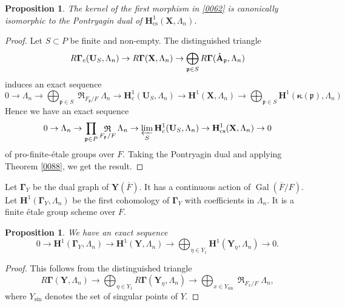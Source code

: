 \documentclass{amsart}
\newtheorem{Prop}[Thm]{Proposition}
\theoremstyle{remark}
\numberwithin{equation}{section}
\newcommand{\closure}[1]{\overline{#1}}
\newcommand{\invlim}{\varprojlim}
\newcommand{\alg}[1]{\mathbf{#1}}
\newcommand{\ideal}[1]{\mathfrak{#1}}
\newcommand{\varalg}[1]{\bm{#1}}
\newcommand{\cs}{\mathrm{cs}}
\DeclareMathOperator{\Gal}{Gal}
\DeclareMathOperator{\Weil}{\mathfrak{R}}
\begin{document}
\begin{Prop}
	The kernel of the first morphism in \eqref{0062} is canonically isomorphic to
	the Pontryagin dual of $\alg{H}^{1}_{\cs}(\alg{X}, \Lambda_{n})$.
\end{Prop}

\begin{proof}
	Let $S \subset P$ be finite and non-empty.
	The distinguished triangle
		\[
				R \alg{\Gamma}_{c}(\alg{U}_{S}, \Lambda_{n})
			\to
				R \alg{\Gamma}(\alg{X}, \Lambda_{n})
			\to
				\bigoplus_{\ideal{p} \in S}
					R \alg{\Gamma}(\Hat{\alg{A}}_{\ideal{p}}, \Lambda_{n})
		\]
	induces an exact sequence
		\[
				0
			\to
				\Lambda_{n}
			\to
				\bigoplus_{\ideal{p} \in S}
					\Weil_{F_{\ideal{p}} / F}
						\Lambda_{n}
			\to
				\alg{H}^{1}_{c}(\alg{U}_{S}, \Lambda_{n})
			\to
				\alg{H}^{1}(\alg{X}, \Lambda_{n})
			\to
				\bigoplus_{\ideal{p} \in S}
					\alg{H}^{1}(\varalg{\kappa}(\ideal{p}), \Lambda_{n})
		\]
	Hence we have an exact sequence
		\[
				0
			\to
				\Lambda_{n}
			\to
				\prod_{\ideal{p} \in P}
					\Weil_{F_{\ideal{p}} / F}
						\Lambda_{n}
			\to
				\invlim_{S}
					\alg{H}^{1}_{c}(\alg{U}_{S}, \Lambda_{n})
			\to
				\alg{H}^{1}_{\cs}(\alg{X}, \Lambda_{n})
			\to
				0
		\]
	of pro-finite-\'etale groups over $F$.
	Taking the Pontryagin dual and applying Theorem \ref{0088}, we get the result.
\end{proof}

Let $\alg{\Gamma}_{Y}$ be the dual graph of $\alg{Y}(\closure{F})$.
It has a continuous action of $\Gal(\closure{F} / F)$.
Let $\alg{H}^{1}(\alg{\Gamma}_{Y}, \Lambda_{n})$ be the first cohomology
of $\alg{\Gamma}_{Y}$ with coefficients in $\Lambda_{n}$.
It is a finite \'etale group scheme over $F$.

\begin{Prop}
	We have an exact sequence
		\[
				0
			\to
				\alg{H}^{1}(\alg{\Gamma}_{Y}, \Lambda_{n})
			\to
				\alg{H}^{1}(\alg{Y}, \Lambda_{n})
			\to
				\bigoplus_{\eta \in Y_{1}}
					\alg{H}^{1}(\alg{Y}_{\eta}, \Lambda_{n})
			\to
				0.
		\]
\end{Prop}

\begin{proof}
	This follows from the distinguished triangle
		\[
				R \alg{\Gamma}(\alg{Y}, \Lambda_{n})
			\to
				\bigoplus_{\eta \in Y_{1}}
					R \alg{\Gamma}(\alg{Y}_{\eta}, \Lambda_{n})
			\to
				\bigoplus_{x \in Y_{\mathrm{sin}}}
					\Weil_{F_{x} / F}
						\Lambda_{n},
		\]
	where $Y_{\mathrm{sin}}$ denotes the set of singular points of $Y$.
\end{proof}
\end{document}
